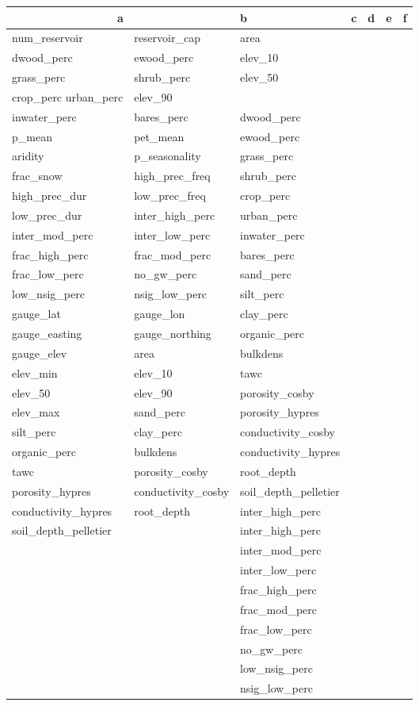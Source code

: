 \begin{tabular}{ll|lllll}
\hline 
\multicolumn {2}{c}{a}  &  b & c & d & e & f \\
\hline
num\_reservoir & reservoir\_cap & area \\
 dwood\_perc & ewood\_perc & elev\_10\\
 grass\_perc & shrub\_perc & elev\_50\\
 crop\_perc urban\_perc & elev\_90 \\
 inwater\_perc &bares\_perc & dwood\_perc \\
 p\_mean & pet\_mean & ewood\_perc \\
 aridity & p\_seasonality & grass\_perc \\
 frac\_snow & high\_prec\_freq & shrub\_perc \\
 high\_prec\_dur & low\_prec\_freq & crop\_perc \\
 low\_prec\_dur & inter\_high\_perc & urban\_perc \\
 inter\_mod\_perc & inter\_low\_perc & inwater\_perc \\
 frac\_high\_perc & frac\_mod\_perc & bares\_perc \\
 frac\_low\_perc & no\_gw\_perc & sand\_perc \\
 low\_nsig\_perc & nsig\_low\_perc & silt\_perc \\
 gauge\_lat & gauge\_lon & clay\_perc \\
 gauge\_easting & gauge\_northing & organic\_perc \\
 gauge\_elev & area & bulkdens \\
 elev\_min & elev\_10 & tawc \\
 elev\_50 & elev\_90 & porosity\_cosby \\
 elev\_max & sand\_perc & porosity\_hypres \\
 silt\_perc & clay\_perc & conductivity\_cosby \\
 organic\_perc & bulkdens & conductivity\_hypres \\
 tawc & porosity\_cosby & root\_depth \\
 porosity\_hypres & conductivity\_cosby & soil\_depth\_pelletier \\
 conductivity\_hypres & root\_depth & inter\_high\_perc \\
 soil\_depth\_pelletier & & inter\_high\_perc \\
& & inter\_mod\_perc \\
& & inter\_low\_perc \\
& & frac\_high\_perc \\
& & frac\_mod\_perc \\
& & frac\_low\_perc \\
& & no\_gw\_perc \\
& & low\_nsig\_perc \\
& & nsig\_low\_perc \\
\end{tabular}
